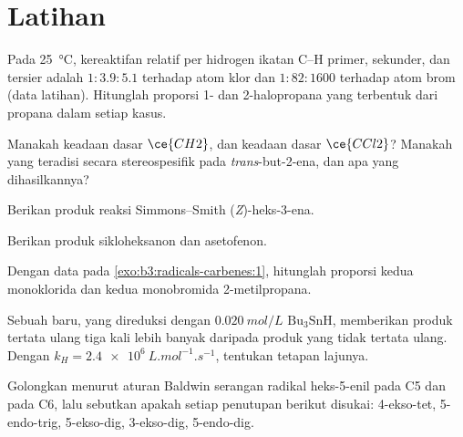 \section{Latihan}

\begin{exercise}[$\star$]\label{exo:b3:radicals-carbenes:1}
Pada \qty{25}{\celsius}, kereaktifan relatif per hidrogen ikatan C--H primer, sekunder, dan
tersier adalah $1 : 3.9 : 5.1$ terhadap atom klor dan $1 : 82 : 1600$ terhadap
atom brom (data latihan). Hitunglah proporsi 1- dan 2-halopropana
yang terbentuk dari propana dalam setiap kasus.
\end{exercise}

\begin{exercise}[$\star$]\label{exo:b3:radicals-carbenes:2}
Manakah keadaan dasar $\ce{CH2}$, dan keadaan dasar $\ce{CCl2}$? Manakah yang teradisi secara stereospesifik pada
\textit{trans}-but-2-ena, dan apa yang dihasilkannya?
\end{exercise}

\begin{exercise}[$\star$]\label{exo:b3:radicals-carbenes:3}
Berikan produk reaksi Simmons--Smith (\textit{Z})-heks-3-ena.
\end{exercise}

\begin{exercise}[$\star$]\label{exo:b3:radicals-carbenes:4}
Berikan produk  sikloheksanon dan
asetofenon.
\end{exercise}

\begin{exercise}[$\star\star$]\label{exo:b3:radicals-carbenes:5}
Dengan data pada \cref{exo:b3:radicals-carbenes:1}, hitunglah proporsi
kedua monoklorida dan kedua monobromida 2-metilpropana.
\end{exercise}

\begin{exercise}[$\star\star$]\label{exo:b3:radicals-carbenes:6}
Sebuah  baru, yang direduksi dengan $\qty{0.020}{mol/L}$ $\mathrm{Bu_3SnH}$, memberikan produk tertata ulang tiga kali lebih banyak
daripada produk yang tidak tertata ulang. Dengan $k_H = \qty{2.4e6}{L.mol^{-1}.s^{-1}}$, tentukan tetapan lajunya.
\end{exercise}

\begin{exercise}[$\star\star$]\label{exo:b3:radicals-carbenes:7}
Golongkan menurut aturan Baldwin serangan radikal heks-5-enil pada C5 dan pada C6,
lalu sebutkan apakah setiap penutupan berikut disukai: 4-ekso-tet, 5-endo-trig,
5-ekso-dig, 3-ekso-dig, 5-endo-dig.
\end{exercise}

